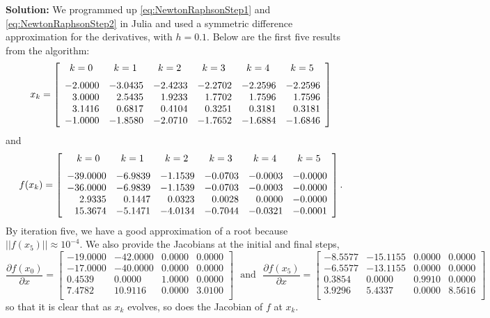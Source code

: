 \textbf{Solution:} We programmed up \eqref{eq:NewtonRaphsonStep1} and \eqref{eq:NewtonRaphsonStep2} in Julia and used a symmetric difference approximation for the derivatives, with $h=0.1$. Below are the first five results from the algorithm:
$$
x_k = \left[
\begin{array}{rrrrrr}
k=0~~ & k=1~~ & k=2 ~~& k=3~~ & k=4~~& k=5~~ \medskip \\
-2.0000 & -3.0435 & -2.4233 & -2.2702 & -2.2596 & -2.2596 \\
3.0000 & 2.5435 & 1.9233 & 1.7702 & 1.7596 & 1.7596 \\
3.1416 & 0.6817 & 0.4104 & 0.3251 & 0.3181 & 0.3181 \\
-1.0000 & -1.8580 & -2.0710 & -1.7652 & -1.6884 & -1.6846 
\end{array}
\right]
$$
and
$$
f(x_k) = 
\left[
\begin{array}{rrrrrr}
k=0~~ & k=1~~ & k=2 ~~& k=3~~ & k=4~~& k=5~~ \medskip\\
-39.0000 & -6.9839 & -1.1539 & -0.0703 & -0.0003 & -0.0000 \\
-36.0000 & -6.9839 & -1.1539 & -0.0703 & -0.0003 & -0.0000 \\
2.9335 & 0.1447 & 0.0323 & 0.0028 & 0.0000 & -0.0000 \\
15.3674 & -5.1471 & -4.0134 & -0.7044 & -0.0321 & -0.0001
\end{array}
\right].
$$
By iteration five, we have a good approximation of a root because $||f(x_5)|| \approx 10^{-4}$.
We also provide the Jacobians at the initial and final steps,
$$
 \frac{\partial f(x_0)}{\partial x}=\left[
\begin{array}{rrrr}
-19.0000 & -42.0000 & 0.0000 & 0.0000 \\
-17.0000 & -40.0000 & 0.0000 & 0.0000 \\
0.4539 & 0.0000 & 1.0000 & 0.0000 \\
7.4782 & 10.9116 & 0.0000 & 3.0100 \\
\end{array}
\right] \text{~~and~~}  \frac{\partial f(x_5)}{\partial x} = 
\left[
\begin{array}{rrrr}
-8.5577 & -15.1155 & 0.0000 & 0.0000 \\
-6.5577 & -13.1155 & 0.0000 & 0.0000 \\
0.3854 & 0.0000 & 0.9910 & 0.0000 \\
3.9296 & 5.4337 & 0.0000 & 8.5616 \\
\end{array}
\right]
$$
so that it is clear that as $x_k$ evolves, so does the Jacobian of $f$ at $x_k$.
\Qed

